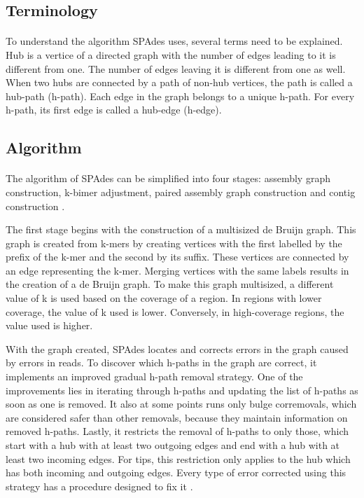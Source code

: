 \subsection{Terminology}
\paragraph*{}
To understand the algorithm SPAdes uses, several terms need to be explained. Hub is a vertice of a directed graph with the number of edges leading to it is different from one. The number of edges leaving it is different from one as well. When two hubs are connected by a path of non-hub vertices, the path is called a hub-path (h-path). Each edge in the graph belongs to a unique h-path. For every h-path, its first edge is called a hub-edge (h-edge).

\subsection{Algorithm}
\paragraph*{}
The algorithm of SPAdes can be simplified into four stages: assembly graph construction, k-bimer adjustment, paired assembly graph construction and contig construction \cite{bankevich2012spades}. 

The first stage begins with the construction of a multisized de Bruijn graph. This graph is created from k-mers by creating vertices with the first labelled by the prefix of the k-mer and the second by its suffix. These vertices are connected by an edge representing the k-mer. Merging vertices with the same labels results in the creation of a de Bruijn graph. To make this graph multisized, a different value of k is used based on the coverage of a region. In regions with lower coverage, the value of k used is lower. Conversely, in high-coverage regions, the value used is higher. 

With the graph created, SPAdes locates and corrects errors in the graph caused by errors in reads. To discover which h-paths in the graph are correct, it implements an improved gradual h-path removal strategy. One of the improvements lies in iterating through h-paths and updating the list of h-paths as soon as one is removed. It also at some points runs only bulge corremovals, which are considered safer than other removals, because they maintain information on removed h-paths. Lastly, it restricts the removal of h-paths to only those, which start with a hub with at least two outgoing edges and end with a hub with at least two incoming edges. For tips, this restriction only applies to the hub which has both incoming and outgoing edges. Every type of error corrected using this strategy has a procedure designed to fix it \cite{bankevich2012spades}.

